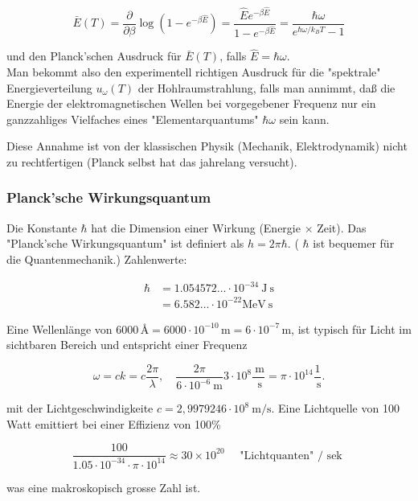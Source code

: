 \documentclass[10pt, letterpaper]{article}
\begin{document}
$$
\bar{E}(T)=\frac{\partial}{\partial \beta} \log \left(1-e^{-\beta \hat{E}}\right)=\frac{\hat{E} e^{-\beta \hat{E}}}{1-e^{-\beta \hat{E}}}=\frac{\hbar \omega}{e^{\hbar \omega / k_{B} T}-1}
$$

und den Planck'schen Ausdruck für $\bar{E}(T)$, falls $\hat{E}=\hbar \omega$.\\
Man bekommt also den experimentell richtigen Ausdruck für die "spektrale" Energieverteilung $u_{\omega}(T)$ der Hohlraumstrahlung, falls man annimmt, daß die Energie der elektromagnetischen Wellen bei vorgegebener Frequenz nur ein ganzzahliges Vielfaches eines "Elementarquantums" $\hbar \omega$ sein kann.

Diese Annahme ist von der klassischen Physik (Mechanik, Elektrodynamik) nicht zu rechtfertigen (Planck selbst hat das jahrelang versucht).




\subsubsection*{Planck'sche Wirkungsquantum}
Die Konstante $\hbar$ hat die Dimension einer Wirkung (Energie $\times$ Zeit). Das "Planck'sche Wirkungsquantum" ist definiert als $h=2 \pi \hbar$. ( $\hbar$ ist bequemer für die Quantenmechanik.) Zahlenwerte:

$$
\begin{aligned}
\hbar & =1.054572 \ldots \cdot 10^{-34} \mathrm{~J} \mathrm{~s} \\
& =6.582 \ldots \cdot 10^{-22} \mathrm{MeV} \mathrm{~s}
\end{aligned}
$$

Eine Wellenlänge von $6000\,\text{\AA} = 6000 \cdot 10^{-10}\,\mathrm{m} = 6 \cdot 10^{-7}\,\mathrm{m}$, ist typisch für Licht im sichtbaren Bereich und entspricht einer Frequenz

$$
\omega=c k=c \frac{2 \pi}{\lambda}, \quad \frac{2 \pi}{6 \cdot 10^{-6} \mathrm{~m}} 3 \cdot 10^{8} \frac{\mathrm{~m}}{\mathrm{~s}}=\pi \cdot 10^{14} \frac{1}{\mathrm{~s}} .
$$

mit der Lichtgeschwindigkeite $c=2,9979246 \cdot 10^{8} \mathrm{~m} / \mathrm{s}$. Eine Lichtquelle von 100 Watt emittiert bei einer Effizienz von 100\%

$$
\frac{100}{1.05 \cdot 10^{-34} \cdot \pi \cdot 10^{14}} \approx 30 \times 10^{20} \quad \text { "Lichtquanten" } / \text { sek }
$$

was eine makroskopisch grosse Zahl ist.
\end{document}
